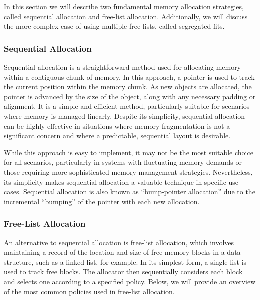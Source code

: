 
In this section we will describe two fundamental memory allocation strategies, called sequential allocation and free-list allocation. Additionally, we will discuss the more complex case of using multiple free-lists, called segregated-fits.

\subsubsection{Sequential Allocation}

Sequential allocation is a straightforward method used for allocating memory within a contiguous chunk of memory. In this approach, a pointer is used to track the current position within the memory chunk. As new objects are allocated, the pointer is advanced by the size of the object, along with any necessary padding or alignment. It is a simple and efficient method, particularly suitable for scenarios where memory is managed linearly. Despite its simplicity, sequential allocation can be highly effective in situations where memory fragmentation is not a significant concern and where a predictable, sequential layout is desirable.

While this approach is easy to implement, it may not be the most suitable choice for all scenarios, particularly in systems with fluctuating memory demands or those requiring more sophisticated memory management strategies. Nevertheless, its simplicity makes sequential allocation a valuable technique in specific use cases. Sequential allocation is also known as ``bump-pointer allocation'' due to the incremental ``bumping'' of the pointer with each new allocation. 

\subsubsection{Free-List Allocation}
An alternative to sequential allocation is free-list allocation, which involves maintaining a record of the location and size of free memory blocks in a data structure, such as a linked list, for example. In its simplest form, a single list is used to track free blocks. The allocator then sequentially considers each block and selects one according to a specified policy. Below, we will provide an overview of the most common policies used in free-list allocation.

